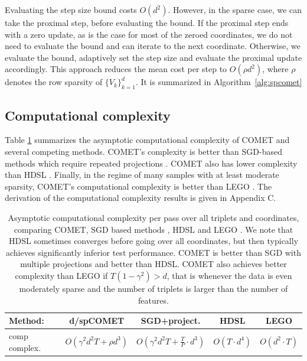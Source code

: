 \documentclass[twoside,11pt]{article}
\newcommand\mat[1]{{#1}}
\newcommand{\Vk}{\mat{V_k}}
\newcommand{\Vgrc}{\{\Vk\}_{k=1}^{d}} %
\begin{document}
Evaluating the step size bound costs $O(d^2)$. However, in the sparse case, we can take the proximal step, before evaluating the bound. If the proximal step ends with a zero update, as is the case for most of the zeroed coordinates, we do not need to evaluate the bound and can iterate to the next coordinate. Otherwise, we evaluate the bound, adaptively set the step size and evaluate the proximal update accordingly. This approach reduces the mean cost per step to $O(\rho d^2)$, where $\rho$ denotes the row sparsity of $\Vgrc$. It is summarized in Algorithm~\ref{alg:spcomet}

\subsection{Computational complexity}

Table \ref{comp-complx} summarizes the asymptotic computational complexity of COMET and several competing methods. COMET's complexity is better than SGD-based methods which require repeated projections \citep{OASIS, qian}. COMET also has lower complexity than HDSL \citep{HDSL}.  Finally, in the regime of many samples with at least moderate sparsity, COMET's computational complexity is better than LEGO \citep{lego}. The derivation of the computational complexity results is given in Appendix C.


\begin{table}[t]
\captionsetup{font=small}
\caption{Asymptotic computational complexity per pass over all triplets and coordinates, comparing COMET, SGD based methods \citep{OASIS, qian}, HDSL \citep{HDSL} and LEGO \citep{lego}. We note that HDSL sometimes converges before going over all coordinates, but then typically achieves significantly inferior test performance. COMET is better than SGD with multiple projections and better than HDSL. COMET also achieves better complexity than LEGO if $T(1-\gamma^2) > d$, that is whenever the data is even moderately sparse and the number of triplets is larger than the number of features.}
\label{comp-complx}
\vskip 0.15in
\begin{center}
\begin{small}
\begin{sc}
\begin{tabular}{lcccc}
\hline
Method: & d/spCOMET  & SGD+project.  & HDSL    & LEGO         \\ 
\hline
comp complex. & $O(\gamma^2 d^2 T +  \rho d^3)$&  $O(\gamma^2 d^2 T + \frac{T}{P} \cdot d^3)$
&   $O( T\cdot  d^4)$ &   $O(d^2 \cdot T)$  \\
\hline
\end{tabular}
\end{sc}
\end{small}
\end{center}
\vskip -0.1in
\end{table}
\end{document}

